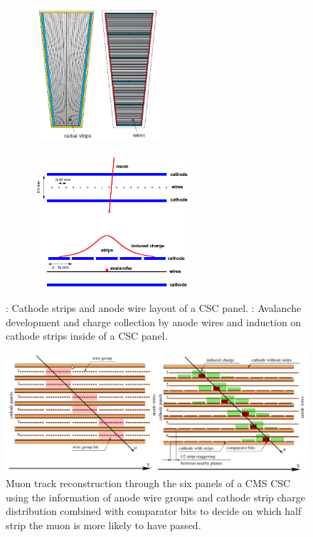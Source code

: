 	\begin{figure}[H]
		\begin{subfigure}{0.4\linewidth}
			\centering
			\includegraphics[height = 5cm]{fig/chapt2/CSC_layout.png}
			\caption{\label{fig:CSC-layout:A}}
		\end{subfigure}
		\begin{subfigure}{0.6\linewidth}
			\centering
			\includegraphics[height = 5cm]{fig/chapt2/CSC_avalanche.png}
			\caption{\label{fig:CSC-layout:B}}
		\end{subfigure}
		\caption{\label{fig:CSC-layout} : Cathode strips and anode wire layout of a CSC panel. : Avalanche development and charge collection by anode wires and induction on cathode strips inside of a CSC panel.}
	\end{figure}
	
	\begin{figure}[H]
		\centering
		\includegraphics[width=\linewidth]{fig/chapt2/CSC_track.png}
		\caption{\label{fig:CSC-track} Muon track reconstruction through the six panels of a CMS CSC using the information of anode wire groups and cathode strip charge distribution combined with comparator bits to decide on which half strip the muon is more likely to have passed.}
	\end{figure}
	
